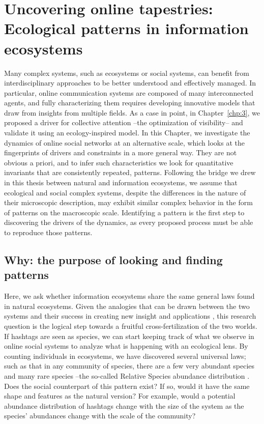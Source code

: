 \chapter{Uncovering online tapestries: Ecological patterns in information ecosystems}\label{chp:4}

Many complex systems, such as ecosystems or social systems, can benefit from interdisciplinary approaches to be better understood and effectively managed. In particular, online communication systems are composed of many interconnected agents, and fully characterizing  them  requires developing innovative models that draw from insights from multiple fields. As a case in point, in Chapter~\ref{chp:3}, we proposed a driver for collective attention --the optimization of visibility-- and validate it using an ecology-inspired model. In this Chapter, we investigate the dynamics of online social networks at an alternative scale, which looks at the fingerprints of drivers and constraints in a more general way. They are not obvious a priori, and to infer such characteristics we look for quantitative invariants that are consistently repeated, patterns. Following the bridge we drew in this thesis between natural and information ecosystems, we assume that ecological and social complex systems, despite the differences in the nature of their microscopic description, may exhibit similar complex behavior in the form of patterns on the macroscopic scale. Identifying a pattern is the first step to discovering the  drivers of the dynamics, as every proposed process must be able to reproduce those patterns.\\
   
\section{Why: the purpose of looking and finding patterns\label{chp:4:1}}

Here, we ask whether information ecosystems share the same general laws found in natural ecosystems. Given the analogies that can be drawn between the two systems and their success in creating new insight and applications \cite{borge2017emergence,palazzi2021ecological,plata2021neutral,calleja2021quantifying,tovo2021upscaling}, this research question is the logical step towards a fruitful cross-fertilization of the two worlds. If hashtags are seen as species, we can start keeping track of what we observe in online social systems to analyze what is happening with an ecological lens. By counting individuals in ecosystems, we have discovered several universal laws; such as that in any community of species, there are a few very abundant species and many rare species --the so-called Relative Species abundance distribution 
\cite{brown1995macroecology,preston1948commonness}. Does the social counterpart of this pattern exist? If so, would it have the same shape and features as the natural version? For example, would a potential abundance distribution of hashtags change with the size of the system as the species' abundances change with the scale of the community? \\

